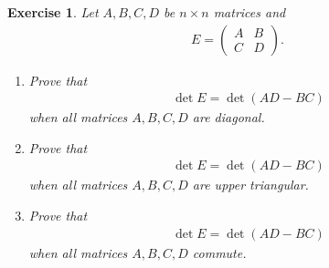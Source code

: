 \documentclass[11pt]{book}
\newtheorem{exercise}{Exercise}[section]
\theoremstyle{definition}
\numberwithin{equation}{chapter}
\begin{document}
\begin{exercise}
Let $A, B, C, D$ be $n \times n$ matrices and 
\begin{align*}
    E = \begin{pmatrix}
        A & B \\
        C & D
    \end{pmatrix}.
\end{align*}
\begin{enumerate}[label=(\alph*)]
    \item Prove that 
    \begin{align*}
        \det E = \det (AD - BC)
    \end{align*}
    when all matrices $A, B, C, D$ are diagonal.
    
    \item Prove that 
    \begin{align*}
        \det E = \det (AD - BC)
    \end{align*}
    when all matrices $A, B, C, D$ are upper triangular. 
    
    \item Prove that
    \begin{align*}
        \det E = \det (AD - BC)
    \end{align*}
    when all matrices $A, B, C, D$ commute. 
\end{enumerate}
\end{exercise}
\end{document}
